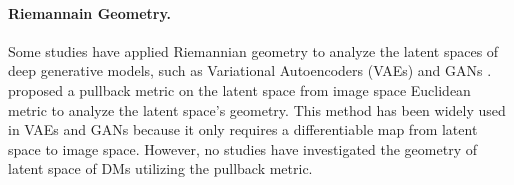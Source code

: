 

\paragraph{Riemannain Geometry.} Some studies have applied Riemannian geometry to analyze the latent spaces of deep generative models, such as Variational Autoencoders (VAEs) and GANs \cite{arvanitidis2017latent, shao2018riemannian, chen2018metrics, arvanitidis2020geometrically, lee2023explicit, pmlr-v162-lee22d, yonghyeon2021regularized}. \citet{shao2018riemannian} proposed a pullback metric on the latent space from image space Euclidean metric to analyze the latent space's geometry. This method has been widely used in VAEs and GANs because it only requires a differentiable map from latent space to image space.
However, no studies have investigated the geometry of latent space of DMs utilizing the pullback metric.